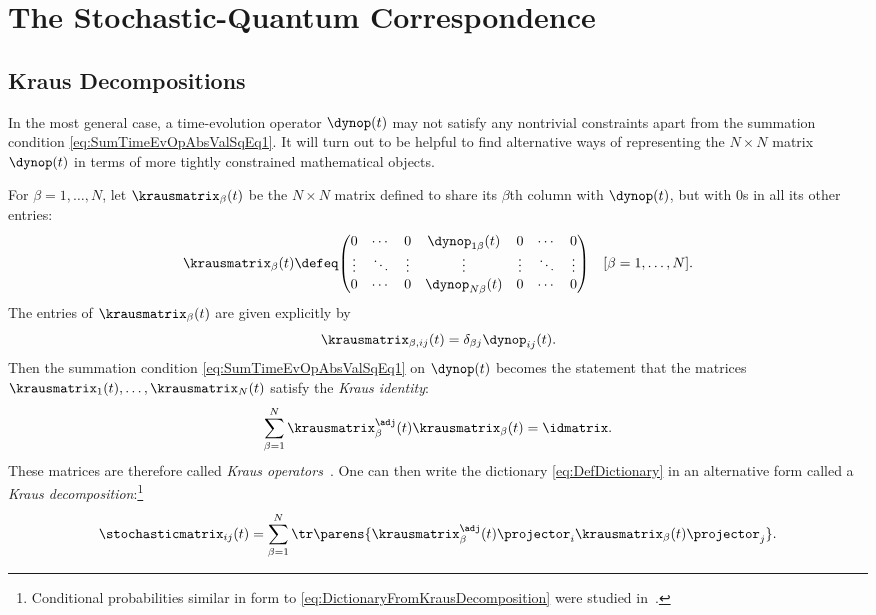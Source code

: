 \documentclass[12pt,english,prl,superscriptaddress,nobibnotes,nofootinbib]{revtex4-2}
\let\originalleft\left
\let\originalright\right
\renewcommand{\left}{\mathopen{}\mathclose\bgroup\originalleft}
\renewcommand{\right}{\aftergroup\egroup\originalright}
\begin{document}
\section{The Stochastic-Quantum Correspondence\label{sec:The-Stochastic-Quantum-Correspondence}}

\subsection{Kraus Decompositions\label{subsec:Kraus-Decompositions}}

In the most general case, a time-evolution operator $\dynop\left(t\right)$
may not satisfy any nontrivial constraints apart from the summation
condition \eqref{eq:SumTimeEvOpAbsValSqEq1}. It will turn out to
be helpful to find alternative ways of representing the $N\times N$
matrix $\dynop\left(t\right)$ in terms of more tightly constrained
mathematical objects.

For $\beta=1,\dots,N$, let $\krausmatrix_{\beta}\left(t\right)$
be the $N\times N$ matrix defined to share its $\beta$th column
with $\dynop\left(t\right)$, but with $0$s in all its other entries:
\begin{equation}
\krausmatrix_{\beta}\left(t\right)\defeq\begin{pmatrix}0 & \cdots & 0 & \dynop_{1\beta}\left(t\right) & 0 & \cdots & 0\\
\vdots & \ddots & \vdots & \vdots & \vdots & \ddots & \vdots\\
0 & \cdots & 0 & \dynop_{N\beta}\left(t\right) & 0 & \cdots & 0
\end{pmatrix}\quad\left[\beta=1,\dots,N\right].\label{eq:DefKrausOperator}
\end{equation}
 The entries of $\krausmatrix_{\beta}\left(t\right)$ are given explicitly
by 
\begin{equation}
\krausmatrix_{\beta,ij}\left(t\right)=\delta_{\beta j}\dynop_{ij}\left(t\right).\label{eq:DefKrausOperatorEntries}
\end{equation}
 Then the summation condition \eqref{eq:SumTimeEvOpAbsValSqEq1} on
$\dynop\left(t\right)$ becomes the statement that the matrices $\krausmatrix_{1}\left(t\right),\dots,\krausmatrix_{N}\left(t\right)$
satisfy the \emph{Kraus identity}: 
\begin{equation}
\sum_{\beta=1}^{N}\krausmatrix_{\beta}^{\adj}\left(t\right)\krausmatrix_{\beta}\left(t\right)=\idmatrix.\label{eq:DefKrausIdentity}
\end{equation}
 These matrices are therefore called \emph{Kraus operators}~\citep{Kraus:1971gscqt}.
One can then write the dictionary \eqref{eq:DefDictionary} in an
alternative form called a \emph{Kraus decomposition}:\footnote{Conditional probabilities similar in form to \eqref{eq:DictionaryFromKrausDecomposition}
were studied in~\citep{BarandesKagan:2023qcpanmoqi}.} 
\begin{equation}
\stochasticmatrix_{ij}\left(t\right)=\sum_{\beta=1}^{N}\tr\parens{\krausmatrix_{\beta}^{\adj}\left(t\right)\projector_{i}\krausmatrix_{\beta}\left(t\right)\projector_{j}}.\label{eq:DictionaryFromKrausDecomposition}
\end{equation}
\end{document}
